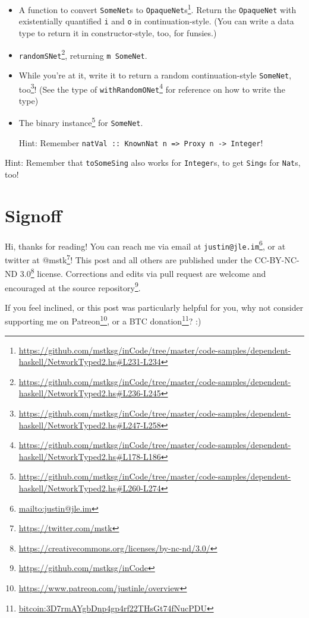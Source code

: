 \documentclass[]{article}
\renewcommand{\href}[2]{#2\footnote{\url{#1}}}
\begin{document}
\begin{enumerate}
  \begin{itemize}
  \item
    A function to
    \href{https://github.com/mstksg/inCode/tree/master/code-samples/dependent-haskell/NetworkTyped2.hs\#L231-L234}{convert
    \texttt{SomeNet}s to \texttt{OpaqueNet}s}. Return the \texttt{OpaqueNet}
    with existentially quantified \texttt{i} and \texttt{o} in
    continuation-style. (You can write a data type to return it in
    constructor-style, too, for funsies.)
  \item
    \href{https://github.com/mstksg/inCode/tree/master/code-samples/dependent-haskell/NetworkTyped2.hs\#L236-L245}{\texttt{randomSNet}},
    returning \texttt{m\ SomeNet}.
  \item
    While you're at it, write it to return
    \href{https://github.com/mstksg/inCode/tree/master/code-samples/dependent-haskell/NetworkTyped2.hs\#L247-L258}{a
    random continuation-style \texttt{SomeNet}, too}! (See the type of
    \href{https://github.com/mstksg/inCode/tree/master/code-samples/dependent-haskell/NetworkTyped2.hs\#L178-L186}{\texttt{withRandomONet\textquotesingle{}}}
    for reference on how to write the type)
  \item
    The
    \href{https://github.com/mstksg/inCode/tree/master/code-samples/dependent-haskell/NetworkTyped2.hs\#L260-L274}{binary
    instance} for \texttt{SomeNet}.

    Hint: Remember
    \texttt{natVal\ ::\ KnownNat\ n\ =\textgreater{}\ Proxy\ n\ -\textgreater{}\ Integer}!
  \end{itemize}

  Hint: Remember that \texttt{toSomeSing} also works for \texttt{Integer}s, to
  get \texttt{Sing}s for \texttt{Nat}s, too!
\end{enumerate}

\section{Signoff}\label{signoff}

Hi, thanks for reading! You can reach me via email at
\href{mailto:justin@jle.im}{\nolinkurl{justin@jle.im}}, or at twitter at
\href{https://twitter.com/mstk}{@mstk}! This post and all others are published
under the \href{https://creativecommons.org/licenses/by-nc-nd/3.0/}{CC-BY-NC-ND
3.0} license. Corrections and edits via pull request are welcome and encouraged
at \href{https://github.com/mstksg/inCode}{the source repository}.

If you feel inclined, or this post was particularly helpful for you, why not
consider \href{https://www.patreon.com/justinle/overview}{supporting me on
Patreon}, or a \href{bitcoin:3D7rmAYgbDnp4gp4rf22THsGt74fNucPDU}{BTC donation}?
:)
\end{document}
